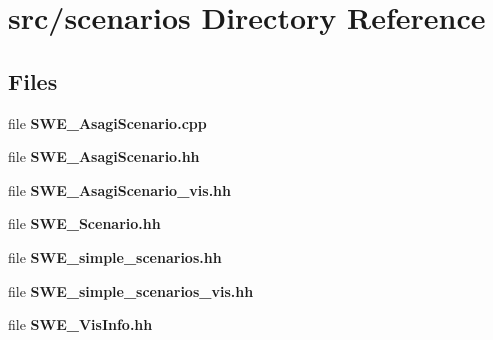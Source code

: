 \section{src/scenarios Directory Reference}
\label{dir_ce641ecd0feac39632e1be43a1a6a10e}
\subsection*{Files}
\begin{DoxyCompactItemize}
\item 
file {\bf S\-W\-E\-\_\-\-Asagi\-Scenario.\-cpp}
\item 
file {\bf S\-W\-E\-\_\-\-Asagi\-Scenario.\-hh}
\item 
file {\bf S\-W\-E\-\_\-\-Asagi\-Scenario\-\_\-vis.\-hh}
\item 
file {\bf S\-W\-E\-\_\-\-Scenario.\-hh}
\item 
file {\bf S\-W\-E\-\_\-simple\-\_\-scenarios.\-hh}
\item 
file {\bfseries S\-W\-E\-\_\-simple\-\_\-scenarios\-\_\-vis.\-hh}
\item 
file {\bf S\-W\-E\-\_\-\-Vis\-Info.\-hh}
\end{DoxyCompactItemize}
